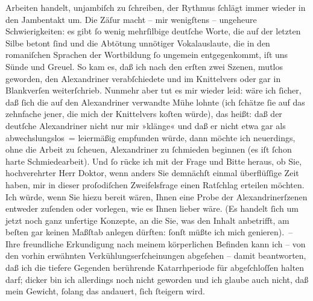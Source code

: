 \begin{ledgroupsized}[t]{13cm}
               Arbeiten handelt, unjambiſch zu ſchreiben, der Rythmus ſchlägt immer wieder in den
               Jambentakt um. Die Zäſur macht – mir wenigſtens – ungeheure Schwierigkeiten: es gibt
               ſo wenig  mehrſilbige deutſche Worte, die auf
               der letzten Silbe betont {\pb}ſind und die Abtötung
               unnötiger Vokalauslaute, die in den romaniſchen Sprachen der Wortbildung ſo ungemein
                  entgegenkommt, iſt uns Sünde und Greuel. So kam
               es, daß ich nach den erſten zwei Szenen, mutlos geworden, den Alexandriner
               verabſchiedete und im Knittelvers oder gar in Blankverſen weiterſchrieb. Nunmehr aber
               tut es mir wieder leid: wäre ich ſicher, daß ſich die auf den Alexandriner verwandte
               Mühe lohnte (ich ſchätze ſie auf das zehnfache jener, die mich der Knittelvers koſten
               würde), das heißt: daß der deutſche Alexandriner nicht nur mir »klänge« und daß er
               nicht etwa gar als abwechslungslos = leiermäßig empfunden würde, dann möchte ich
               neuerdings, ohne die Arbeit zu ſcheuen, Alexandriner zu ſchmieden beginnen (es iſt
               ſchon harte Schmiedearbeit).\pend
           \pstart
           Und ſo rücke ich mit der Frage und Bitte heraus, ob Sie, hochverehrter Herr Doktor,
               wenn anders Sie demnächſt einmal überflüſſige Zeit haben, mir {\pb}in dieser proſodiſchen Zweifelsfrage einen Ratſchlag
               erteilen möchten. Ich würde, wenn Sie hiezu bereit wären, Ihnen eine Probe der
               Alexandrinerſzenen entweder zuſenden oder vorlegen, wie es Ihnen lieber wäre. (Es
               handelt ſich um jetzt noch ganz unfertige Konzepte, an die Sie, was den Inhalt
               anbetrifft, am beſten gar keinen Maßſtab anlegen dürften: ſonſt müßte ich mich
               genieren). –\pend
           \pstart
           Ihre freundliche Erkundigung nach meinem körperlichen Befinden kann ich – von den
               vorhin erwähnten Verkühlungserſcheinungen abgeſehen – damit beantworten, daß ich die
               tiefere Gegenden berührende Katarrhperiode für
               abgeſchloſſen halten darf; dicker bin ich allerdings noch nicht geworden und ich
               glaube auch nicht, daß mein Gewicht, ſolang das \label{K_L02246_1v}\label{K_L02246_1h} andauert, {\pb}ſich ſteigern wird.\pend

\end{ledgroupsized}
